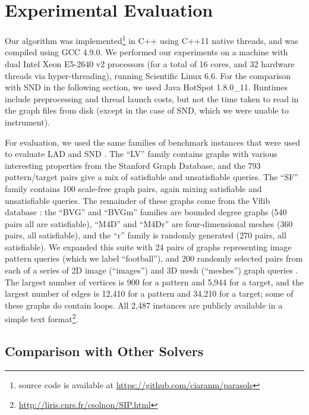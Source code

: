 \documentclass{llncs}
\begin{document}
\section{Experimental Evaluation}\label{section:experiments}

Our algorithm was implemented\footnote{source code is available at
\url{https://github.com/ciaranm/parasols}} in C++ using C++11 native threads, and was compiled using
GCC 4.9.0.  We performed our experiments on a machine with dual Intel Xeon E5-2640 v2 processors
(for a total of 16 cores, and 32 hardware threads via hyper-threading), running Scientific Linux
6.6.  For the comparison with SND in the following section, we used Java HotSpot 1.8.0\_11. Runtimes
include preprocessing and thread launch costs, but not the time taken to read in the graph files
from disk (except in the case of SND, which we were unable to instrument).

For evaluation, we used the same families of benchmark instances that were used to evaluate LAD
\cite{Solnon:2010} and SND \cite{Audemard:2014}. The ``LV'' family \cite{Larrosa:2002} contains
graphs with various interesting properties from the Stanford Graph Database, and the 793
pattern/target pairs give a mix of satisfiable and unsatisfiable queries. The ``SF'' family contains
100 scale-free graph pairs, again mixing satisfiable and unsatisfiable queries. The remainder of
these graphs come from the Vflib database \cite{Cordella:2004}: the ``BVG'' and ``BVGm'' families
are bounded degree graphs (540 pairs all are satisfiable), ``M4D'' and ``M4Dr'' are four-dimensional
meshes (360 pairs, all satisfiable), and the ``r'' family is randomly generated (270 pairs, all
satisfiable).  We expanded this suite with 24 pairs of graphs representing image pattern queries
\cite{Damiand:2011} (which we label ``football''), and 200 randomly selected pairs from each of a
series of 2D image (``images'') and 3D mesh (``meshes'') graph queries \cite{Solnon:2015}. The
largest number of vertices is 900 for a pattern and 5,944 for a target, and the largest number of
edges is 12,410 for a pattern and 34,210 for a target; some of these graphs do contain loops. All
2,487 instances are publicly available in a simple text
format\footnote{\url{http://liris.cnrs.fr/csolnon/SIP.html}}.

\subsection{Comparison with Other Solvers}
\end{document}
